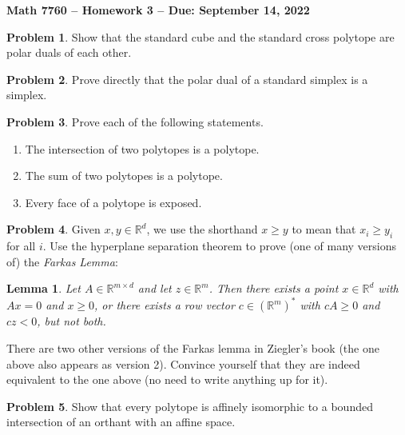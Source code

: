 \documentclass[letterpaper,11pt]{amsart}
\theoremstyle{plain}
\newtheorem{lemma}[thm]{Lemma}
\theoremstyle{definition}
\newtheorem{pr}{Problem}
\theoremstyle{remark}
\begin{document}
\Large

\begin{center}
{\bf Math 7760 -- Homework  3 --  Due:  September 14, 2022}
\end{center}

\normalsize


\bigskip


\bigskip

\begin{pr}
    Show that the standard cube and the standard cross polytope are polar duals of each other.
\end{pr}

\begin{pr}
    Prove directly that the polar dual of a standard simplex is a simplex.
\end{pr}

\bigskip


\bigskip

\begin{pr}
    Prove each of the following statements. 
    \begin{enumerate}
        \item The intersection of two polytopes is a polytope.
        \item The sum of two polytopes is a polytope.
        \item Every face of a polytope is exposed.
    \end{enumerate}
\end{pr}

\begin{pr}
    Given $x,y \in \mathbb{R}^d$, we use the shorthand $x \ge y$ to mean that $x_i \ge y_i$ for all $i$.
    Use the hyperplane separation theorem to prove (one of many versions of) the \emph{Farkas Lemma}:
    \begin{lemma}
        Let $A \in \mathbb{R}^{m\times d}$ and let $z \in \mathbb{R}^m$.
        Then there exists a point $x \in \mathbb{R}^d$ with $Ax = 0$ and $x \ge 0$,
        or there exists a row vector $c \in (\mathbb{R}^m)^*$ with $cA \ge 0$ and $cz < 0$,
        but not both.
    \end{lemma}
    There are two other versions of the Farkas lemma in Ziegler's book (the one above also appears as version 2).
    Convince yourself that they are indeed equivalent to the one above (no need to write anything up for it).
\end{pr}

\begin{pr}
    Show that every polytope is affinely isomorphic to a bounded intersection of an orthant with an affine space.
\end{pr}
\end{document}
